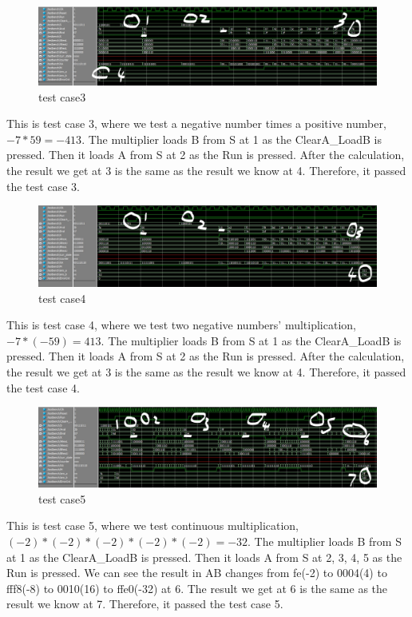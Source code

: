 \documentclass[12pt]{article}
\begin{document}
\begin{figure}[H]
    \centering
    \includegraphics[width=18cm]{case3.jpg}
    \caption{test case3}
\end{figure}
This is test case 3, where we test a negative number times a positive number, $-7*59=-413$. The multiplier loads B from S at 1 as the ClearA\_LoadB is pressed. Then it loads A from S at 2 as the Run is pressed. After the calculation, the result we get at 3 is the same as the result we know at 4. Therefore, it passed the test case 3.

\begin{figure}[H]
    \centering
    \includegraphics[width=18cm]{case4.jpg}
    \caption{test case4}
\end{figure}
This is test case 4, where we test two negative numbers' multiplication, $-7*(-59)=413$. The multiplier loads B from S at 1 as the ClearA\_LoadB is pressed. Then it loads A from S at 2 as the Run is pressed. After the calculation, the result we get at 3 is the same as the result we know at 4. Therefore, it passed the test case 4.

\begin{figure}[H]
    \centering
    \includegraphics[width=18cm]{case5.jpg}
    \caption{test case5}
\end{figure}
This is test case 5, where we test continuous multiplication, $(-2)*(-2)*(-2)*(-2)*(-2) = -32$. The multiplier loads B from S at 1 as the ClearA\_LoadB is pressed. Then it loads A from S at 2, 3, 4, 5 as the Run is pressed. We can see the result in AB changes from fe(-2) to 0004(4) to fff8(-8) to 0010(16) to ffe0(-32) at 6. The result we get at 6 is the same as the result we know at 7. Therefore, it passed the test case 5.
\end{document}
